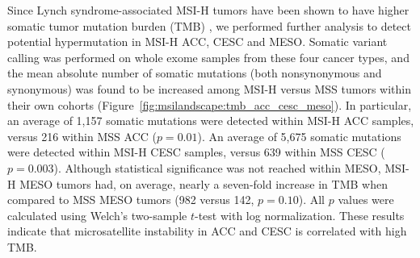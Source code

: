 Since Lynch syndrome-associated MSI-H tumors have been shown to have higher somatic tumor mutation burden (TMB) \cite{le2015,gatalica2016}, we performed further analysis to detect potential hypermutation in MSI-H ACC, CESC and MESO\@. Somatic variant calling was performed on whole exome samples from these four cancer types, and the mean absolute number of somatic mutations (both nonsynonymous and synonymous) was found to be increased among MSI-H versus MSS tumors within their own cohorts (Figure~\ref{fig:msilandscape:tmb_acc_cesc_meso}). In particular, an average of 1,157 somatic mutations were detected within MSI-H ACC samples, versus 216 within MSS ACC ($p = 0.01$). An average of 5,675 somatic mutations were detected within MSI-H CESC samples, versus 639 within MSS CESC ($p = 0.003$). Although statistical significance was not reached within MESO, MSI-H MESO tumors had, on average, nearly a seven-fold increase in TMB when compared to MSS MESO tumors (982 versus 142, $p = 0.10$). All $p$ values were calculated using Welch's two-sample $t$-test with log normalization. These results indicate that microsatellite instability in ACC and CESC is correlated with high TMB\@.

